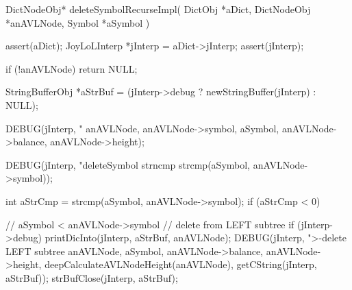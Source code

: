 \startCCode
DictNodeObj* deleteSymbolRecurseImpl(
  DictObj     *aDict,
  DictNodeObj *anAVLNode,
  Symbol      *aSymbol
) {
  assert(aDict);
  JoyLoLInterp *jInterp = aDict->jInterp;
  assert(jInterp);
  
  if (!anAVLNode) return NULL;

  StringBufferObj *aStrBuf = 
    (jInterp->debug ? newStringBuffer(jInterp) : NULL);

  DEBUG(jInterp, "\ndeleteSymbol %
        anAVLNode, anAVLNode->symbol, aSymbol,
        anAVLNode->balance, anAVLNode->height);

  DEBUG(jInterp, "deleteSymbol strncmp %
        strcmp(aSymbol, anAVLNode->symbol));

  int aStrCmp = strcmp(aSymbol, anAVLNode->symbol);
  if (aStrCmp < 0) {
    // aSymbol < anAVLNode->symbol // delete from LEFT subtree
    if (jInterp->debug) {
      printDicInto(jInterp, aStrBuf, anAVLNode);
      DEBUG(jInterp, ">-delete LEFT subtree %
            anAVLNode, aSymbol, anAVLNode->balance,
            anAVLNode->height, deepCalculateAVLNodeHeight(anAVLNode),
            getCString(jInterp, aStrBuf));
      strBufClose(jInterp, aStrBuf);
    }

}}
